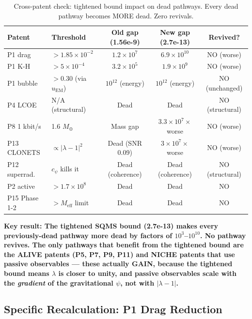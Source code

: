 \documentclass[11pt]{article}
\begin{document}
\begin{table}[h]
\centering
\begin{tabular}{llccc}
\toprule
\textbf{Patent} & \textbf{Threshold} & \textbf{Old gap (1.56e-9)} & \textbf{New gap (2.7e-13)} & \textbf{Revived?} \\
\midrule
P1 drag & $> 1.85 \times 10^{-2}$ & $1.2 \times 10^{7}$ & $6.9 \times 10^{10}$ & NO (worse) \\
P1 K-H & $> 5 \times 10^{-4}$ & $3.2 \times 10^{5}$ & $1.9 \times 10^{9}$ & NO (worse) \\
P1 bubble & $> 0.30$ (via $u_\text{EM}$) & $10^{12}$ (energy) & $10^{12}$ (energy) & NO (unchanged) \\
P4 LCOE & N/A (structural) & Dead & Dead & NO (structural) \\
P8 1 kbit/s & 1.6 $M_\oplus$ & Mass gap & $3.3 \times 10^7 \times$ worse & NO (worse) \\
P13 CLONETS & $\propto |\lambda-1|^2$ & Dead (SNR 0.09) & $3 \times 10^7\times$ worse & NO (worse) \\
P12 superrad. & $c_\psi$ kills it & Dead (coherence) & Dead (coherence) & NO (structural) \\
\midrule
P2 active & $> 1.7 \times 10^8$ & Dead & Dead & NO \\
P15 Phase 1-2 & $> M_\text{eff}$ limit & Dead & Dead & NO \\
\bottomrule
\end{tabular}
\caption{Cross-patent check: tightened bound impact on dead pathways. Every dead pathway becomes MORE dead. Zero revivals.}
\end{table}

\textbf{Key result: The tightened SQMS bound (2.7e-13) makes every previously-dead pathway more dead by factors of $10^3$--$10^{10}$. No pathway revives. The only pathways that benefit from the tightened bound are the ALIVE patents (P5, P7, P9, P11) and NICHE patents that use passive observables --- these actually GAIN, because the tightened bound means $\lambda$ is closer to unity, and passive observables scale with the \emph{gradient} of the gravitational $\psi$, not with $|\lambda-1|$.}

\subsection{Specific Recalculation: P1 Drag Reduction}
\end{document}
